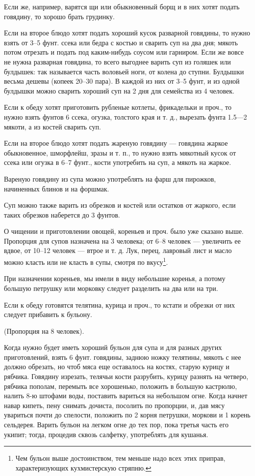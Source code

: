 Если же, например, варятся щи или обыкновенный борщ и в них хотят подать говядину, то хорошо брать грудинку.

Если на второе блюдо хотят подать хороший кусок разварной говядины, то нужно взять от 3–5 фунт. ссека или бедра с костью и сварить суп на два дня; мякоть потом отрезать и подать под каким-нибудь соусом или гарниром. Если же вовсе не нужна разварная говядина, то всего выгоднее варить суп из голяшек или булдышек: так называется часть воловьей ноги, от колена до ступни. Булдышки весьма дешевы (копеек 20–30 пара). В каждой из них от 3–5 фунт, и из одной булдышки можно сварить хороший суп на 2 дня для семейства из 4 человек.

Если к обеду хотят приготовить рубленые котлеты, фрикадельки и проч., то нужно взять фунтов 6 ссека, огузка, толстого края и т. д., вырезать фунта 1.5—2 мякоти, а из костей сварить суп.

Если на второе блюдо хотят подать жареную говядину — говядина жаркое обыкновенное, шморфлейш, зразы и т. п., то нужно взять мякотный кусок от ссека или огузка в 6–7 фунт., кости употребить на суп, а мякоть на жаркое.

Вареную говядину из супа можно употреблять на фарш для пирожков, начиненных блинов и на форшмак.

Суп можно также варить из обрезков и костей или остатков от жаркого, если таких обрезков наберется до 3 фунтов.

О чищении и приготовлении овощей, кореньев и проч. было уже сказано выше. Пропорция для супов назначена на 3 человека; от 6–8 человек — увеличить ее вдвое, от 10–12 человек — втрое и т. д. Лук, перец, лавровый лист и масло можно класть или не класть в супы, смотря по вкусу\footnote{Чем бульон выше достоинством, тем меньше надо всех этих приправ, характеризующих кухмистерскую стряпню.}.

При назначении кореньев, мы имели в виду небольшие коренья, а потому большую петрушку или морковку следует разделить на два или на три.

Если к обеду готовятся телятина, курица и проч., то кстати и обрезки от них следует прибавить к бульону.


(Пропорция на 8 человек).

Когда нужно будет иметь хороший бульон для супа и для разных других приготовлений, взять 6 фунт. говядины, заднюю ножку телятины, мякоть с нее должно обрезать, но чтоб мяса еще оставалось на костях, старую курицу и рябчика. Говядину изрезать, телячьи кости разрубить, курицу разнять на четверо, рябчика пополам, перемыть все хорошенько, положить в большую кастрюлю, налить 8-ю штофами воды, поставить вариться на небольшом огне. Когда начнет навар кипеть, пену снимать дочиста, посолить по пропорции, и, дав мясу увариться почти до спелости, положить по 2 корня петрушки, моркови и 1 корень сельдерея. Варить бульон на легком огне до тех пор, пока третья часть его укипит; тогда, процедив сквозь салфетку, употреблять для кушанья.

